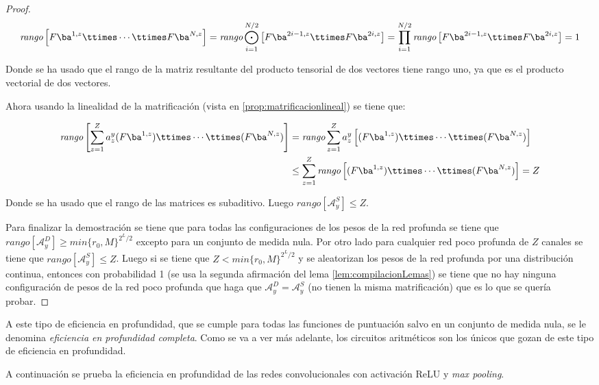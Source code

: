 \begin{proof}
$$
\textit{rango}\left[ F\ba^{1,z}\ttimes \cdots  \ttimes F\ba^{N,z}  \right] = \textit{rango} \bigodot_{i=1}^{N/2}\left[ F\ba^{2i-1,z} \ttimes F\ba^{2i,z} \right]
 = \prod_{i=1}^{N/2}\textit{rango}\left[  F\ba^{2i-1,z} \ttimes F\ba^{2i,z} \right]  = 1
$$

Donde se ha usado que el rango de la matriz resultante del producto tensorial de dos vectores tiene rango uno, ya que es el producto vectorial de dos vectores.

Ahora usando la linealidad de la matrificación (vista en \ref{prop:matrificacionlineal}) se tiene que:

\begin{align*}
\textit{rango}\left[ \sum_{z=1}^{Z}a^y_z(F\ba^{1,z})\ttimes\cdots \ttimes(F\ba^{N,z}) \right]
&= \textit{rango} \sum_{z=1}^Z  a^y_z \left[ (F\ba^{1,z})\ttimes\cdots \ttimes(F\ba^{N,z}) \right] \\
&\leq \sum_{z=1}^Z \textit{rango} \left[ (F\ba^{1,z})\ttimes\cdots \ttimes(F\ba^{N,z}) \right] = Z
\end{align*}

Donde se ha usado que el rango de las matrices es subaditivo. Luego $\textit{rango}[\mathcal{A}^S_y] \leq Z$.


Para finalizar la demostración se tiene que para todas las configuraciones de los pesos de la red profunda se tiene que $\textit{rango}[\mathcal{A}^D_y] \geq \textit{min}\{r_0,M\}^{2^L/2}$ excepto para un conjunto de medida nula. Por otro lado para cualquier red poco profunda de $Z$ canales se tiene que $\textit{rango}[\mathcal{A}^S_y] \leq Z$. Luego si se tiene que $Z < \textit{min}\{r_0,M\}^{2^L/2}$ y se aleatorizan los pesos de la red profunda por una distribución continua, entonces con probabilidad 1 (se usa la segunda afirmación del lema \ref{lem:compilacionLemas}) se tiene que no hay ninguna configuración de pesos de la red poco profunda que haga que $\mathcal{A}^D_y=\mathcal{A}^S_y$ (no tienen la misma matrificación) que es lo que se quería probar. 
\end{proof}

A este tipo de eficiencia en profundidad, que se cumple para todas las funciones de puntuación salvo en un conjunto de medida nula, se le denomina \textit{eficiencia en profundidad completa}. Como se va a ver más adelante, los circuitos aritméticos son los únicos que gozan de este tipo de eficiencia en profundidad. 

A continuación se prueba la eficiencia en profundidad de las redes convolucionales con activación ReLU y \textit{max pooling}.

